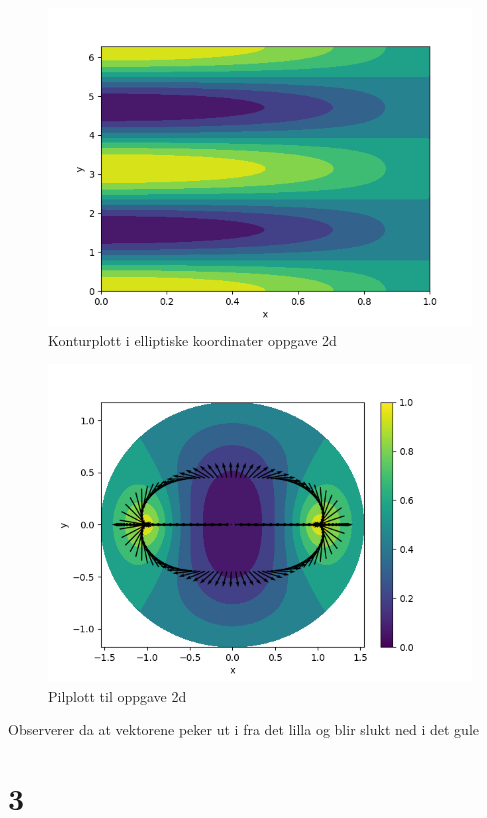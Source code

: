\documentclass[a4paper,10pt,norsk]{article}
\begin{document}
	\begin{figure}[h!]
		\centering
		\caption{Konturplott i elliptiske koordinater oppgave 2d}
		\label{fig:2d_elliptical}
		\includegraphics{2d_elliptical.png}
	\end{figure}
	
		\begin{figure}[h!]
			\centering
			\caption{Pilplott til oppgave 2d}
			\label{fig:2d}
			\includegraphics{2d.png}
		\end{figure}
		Observerer da at vektorene peker ut i fra det lilla og blir slukt ned i det gule
		\newpage
	

\section*{3}
\end{document}
